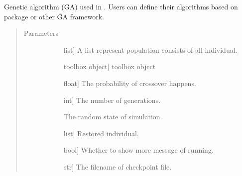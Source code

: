 \documentclass[letterpaper,10pt,english]{sphinxmanual}
\begin{document}
\begin{fulllineitems}
\label{\detokenize{pygace:pygace.ga.gaceGA}}
\sphinxAtStartPar
Genetic algorithm (GA) used in . Users can define their algorithms
based on  package or other GA framework.
\begin{quote}\begin{description}
\item[{Parameters}] \leavevmode\begin{description}
\item[{}] \leavevmode{[}list{]}
\sphinxAtStartPar
A list represent population consists of all individual.

\item[{}] \leavevmode{[}toolbox object{]}
\sphinxAtStartPar
{} toolbox object

\item[{}] \leavevmode{[}float{]}
\sphinxAtStartPar
The probability of crossover happens.

\item[{}] \leavevmode{[}int{]}
\sphinxAtStartPar
The number of generations.

\item[{}] \leavevmode
\sphinxAtStartPar
The random state of simulation.

\item[{}] \leavevmode{[}list{]}
\sphinxAtStartPar
Restored individual.

\item[{}] \leavevmode{[}bool{]}
\sphinxAtStartPar
Whether to show more message of running.

\item[{}] \leavevmode{[}str{]}
\sphinxAtStartPar
The filename of checkpoint file.


\end{description}
\end{description}
\end{quote}
\end{fulllineitems}
\end{document}
